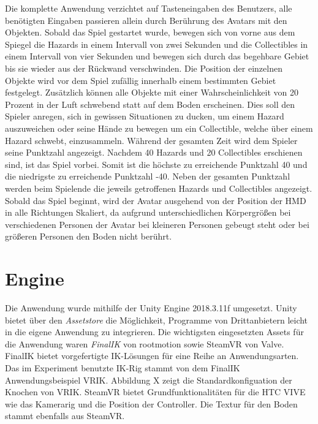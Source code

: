 Die komplette Anwendung verzichtet auf Tasteneingaben des Benutzers, alle benötigten Eingaben passieren allein durch Berührung des Avatars mit den Objekten.
Sobald das Spiel gestartet wurde, bewegen sich von vorne aus dem Spiegel die Hazards in einem Intervall von zwei Sekunden und die Collectibles in einem Intervall von vier Sekunden und bewegen sich durch das begehbare Gebiet bis sie wieder aus der Rückwand verschwinden. Die Position der einzelnen Objekte wird vor dem Spiel zufällig innerhalb einem bestimmten Gebiet festgelegt. Zusätzlich können alle Objekte mit einer Wahrscheinlichkeit von 20 Prozent in der Luft schwebend statt auf dem Boden erscheinen. Dies soll den Spieler anregen, sich in gewissen Situationen zu ducken, um einem Hazard auszuweichen oder seine Hände zu bewegen um ein Collectible, welche über einem Hazard schwebt, einzusammeln. Während der gesamten Zeit wird dem Spieler seine Punktzahl angezeigt. Nachdem 40 Hazards und 20 Collectibles erschienen sind, ist das Spiel vorbei. Somit ist die höchste zu erreichende Punktzahl 40 und die niedrigste zu erreichende Punktzahl -40. Neben der gesamten Punktzahl werden beim Spielende die jeweils getroffenen Hazards und Collectibles angezeigt.
Sobald das Spiel beginnt, wird der Avatar ausgehend von der Position der HMD in alle Richtungen Skaliert, da aufgrund unterschiedlichen Körpergrößen bei verschiedenen Personen der Avatar bei kleineren Personen gebeugt steht oder bei größeren Personen den Boden nicht berührt.


\section{Engine}
Die Anwendung wurde mithilfe der Unity Engine 2018.3.11f umgesetzt.
Unity bietet über den \textit{Assetstore} die Möglichkeit, Programme von Drittanbietern leicht in die eigene Anwendung zu integrieren. Die wichtigsten eingesetzten Assets für die Anwendung waren \textit{FinalIK} von rootmotion\cite{rootmotion} sowie SteamVR von Valve. FinalIK bietet vorgefertigte IK-Lösungen für eine Reihe an Anwendungsarten. Das im Experiment benutzte IK-Rig stammt von dem FinalIK Anwendungsbeispiel VRIK. Abbildung X zeigt die Standardkonfiguation der Knochen von VRIK. SteamVR bietet Grundfunktionalitäten für die HTC VIVE wie das Kamerarig und die Position der Controller. Die Textur für den Boden stammt ebenfalls aus SteamVR.


